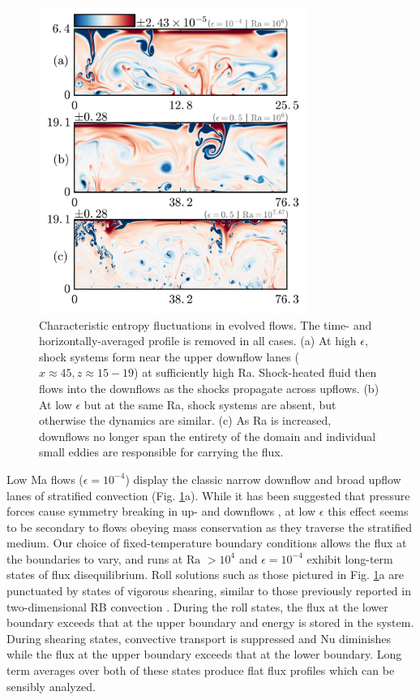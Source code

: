 \documentclass[aps, prl, twocolumn, nofootinbib, groupedaddress, amsfonts, amssymb, amsmath]{revtex4-1}
\begin{document}
\begin{figure}[t]
\includegraphics[width=3.4375in]{./figs/snapshots_fig.png}
\caption{Characteristic entropy fluctuations in evolved flows. 
The time- and horizontally-averaged profile is removed in all cases.  (a) At high
$\epsilon$, shock systems form near the upper downflow lanes ($x \approx 45, z \approx 15-19$)
at sufficiently high Ra.
Shock-heated fluid then flows into the downflows as the shocks propagate across upflows.
(b) At low $\epsilon$ but at the same Ra, shock systems are absent, 
but otherwise the dynamics are similar.  (c) As Ra is increased, downflows no longer span
the entirety of the domain and individual small eddies are responsible for carrying the flux.
\label{fig:entropy_snapshots} }
\end{figure}

Low Ma flows ($\epsilon = 10^{-4}$)
display the classic narrow downflow and broad upflow lanes of stratified
convection (Fig. \ref{fig:entropy_snapshots}a).
While it has been suggested that pressure forces 
cause symmetry breaking in up- and downflows
\cite{hurlburt&all1984}, at low $\epsilon$ this 
effect seems to be secondary to flows obeying mass conservation as they traverse
the stratified medium.  
Our choice of fixed-temperature boundary conditions allows the flux at the 
boundaries to vary, and runs at $\text{Ra }> 10^4$
and $\epsilon = 10^{-4}$ exhibit long-term states of
flux disequilibrium.  Roll solutions such as those pictured in Fig. \ref{fig:entropy_snapshots}a
are punctuated by states of vigorous shearing, similar to those previously
reported in two-dimensional RB convection \cite{goluskin&all2014}.  
During the roll states, the flux at the lower boundary exceeds that at the upper boundary
and energy is stored in the system.
During shearing states, convective transport is suppressed and Nu diminishes while
the flux at the upper boundary exceeds that at the lower boundary.  Long term
averages over both of these states produce flat flux profiles which
can be sensibly analyzed.
\end{document}
